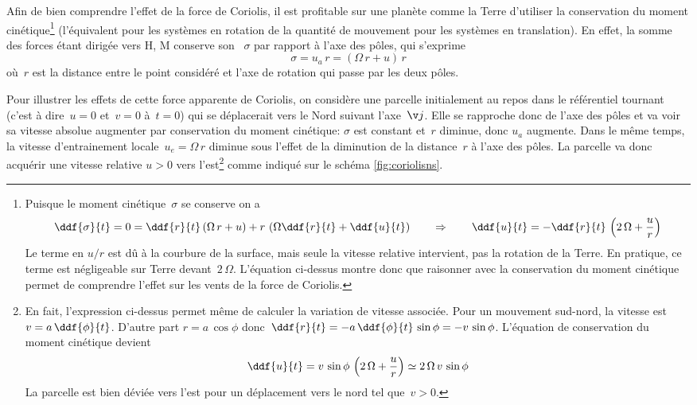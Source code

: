 \sk
Afin de bien comprendre l'effet de la force de Coriolis, il est profitable sur une planète comme la Terre d'utiliser la conservation du moment cinétique\footnote{
Puisque le moment cinétique~$\sigma$ se conserve on a \[ \ddf{\sigma}{t} = 0 = \ddf{r}{t} \, (\Omega \, r + u) + r \, \left( \Omega \ddf{r}{t}+\ddf{u}{t} \right) \qquad \Rightarrow \qquad \ddf{u}{t} = - \ddf{r}{t}  \, \left( 2\,\Omega + \frac{u}{r} \right) \] 
Le terme en $u/r$ est dû à la courbure de la surface, mais seule la vitesse relative intervient, pas la rotation de la Terre. En pratique, ce terme est négligeable sur Terre devant~$2 \, \Omega$. L'équation ci-dessus montre donc que raisonner avec la conservation du moment cinétique permet de comprendre l'effet sur les vents de la force de Coriolis.
}
(l'équivalent pour les systèmes en rotation de la quantité de mouvement pour les systèmes en translation). En effet, la somme des forces étant dirigée vers H, M conserve son ~$\sigma$ par rapport à l'axe des pôles, qui s'exprime
\[ \boxed{ \sigma = u_a \, r = (\Omega \, r + u) \, r } \]
où~$r$ est la distance entre le point considéré et l'axe de rotation qui passe par les deux pôles.

\sk
Pour illustrer les effets de cette force apparente de Coriolis, on considère une parcelle initialement au repos dans le référentiel tournant (c'est à dire~$u=0$ et~$v=0$ à~$t=0$) qui se déplacerait vers le Nord suivant l'axe~$\v j$. Elle se rapproche donc de l'axe des pôles et va voir sa vitesse absolue augmenter par conservation du moment cinétique: $\sigma$ est constant et~$r$ diminue, donc $u_a$ augmente. Dans le même temps, la vitesse d'entrainement locale~$u_e=\Omega \, r$ diminue sous l'effet de la diminution de la distance~$r$ à l'axe des pôles. La parcelle va donc acquérir une vitesse relative $u>0$ vers l'est\footnote{
En fait, l'expression ci-dessus permet même de calculer la variation de vitesse associée. Pour un mouvement sud-nord, la vitesse est $v=a \, \ddf{\phi}{t}$. D'autre part $r=a \, \cos \phi$ donc~$\ddf{r}{t}=-a \, \ddf{\phi}{t} \, \sin \phi = - v \, \sin \phi$. L'équation de conservation du moment cinétique devient 
\[ \ddf{u}{t} = v \, \sin \phi \, \left( 2 \, \Omega + \frac{u}{r} \right) \simeq 2 \, \Omega \, v \, \sin \phi \] 
La parcelle est bien déviée vers l'est pour un déplacement vers le nord tel que~$v>0$.
}
comme indiqué sur le schéma \ref{fig:coriolisns}. 

